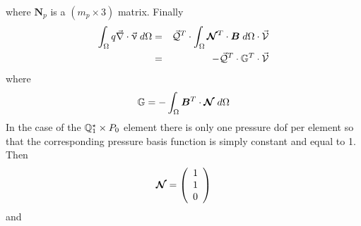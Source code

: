 where ${\bm N}_p$ is a $(m_p \times 3)$ matrix.
Finally
\begin{eqnarray}
\int_\Omega q \vec\nabla \cdot \vec{\upnu} \; d\Omega 
&=& \vec{\cal Q}^T \cdot \int_\Omega {\bm {{\mathcal{N}}}}^T \cdot {\bm B} \; d\Omega \cdot \vec{\cal V} \nonumber\\
&=& - \vec{\cal Q}^T \cdot \mathbb{G}^T \cdot \vec{\cal V} 
\end{eqnarray}
where
\[
\mathbb{G} = -\int_\Omega {\bm B}^T \cdot {\bm {{\mathcal{N}}}}\; d\Omega 
\]
In the case of the ${{\mathbb{Q}}}_1^\star \times P_0$ element there is only one pressure dof per element 
so that the corresponding pressure basis function is simply constant and equal to 1. 
Then 
\[
{\bm {{\mathcal{N}}}} = 
\left(
\begin{array}{c}
1 \\ 1 \\ 0
\end{array}
\right)
\]
and 
